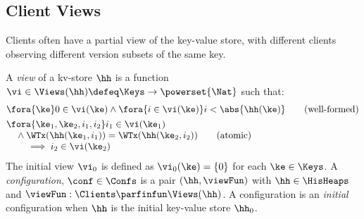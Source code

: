 

\subsection{Client Views}

Clients often have a partial view of the key-value store, 
with different clients observing 
different version subsets  of the same key.

\begin{definition}[View]
\label{def:view}
\label{def:cuts}
\label{def:views}
\label{def:configuration}
A \emph{view} of a kv-store $\hh$ is a function
$\vi \in \Views(\hh) \defeq \Keys \to\powerset{\Nat}$ such that:
\begin{align}
    & \fora{ \ke } 
    0 \in \vi(\ke) 
    \wedge \fora{ i \in \vi(\ke) } 
    i < \abs{ \hh(\ke) } 
    \tag{well-formed}
    \label{eq:view.wf}\\
    & 
    \begin{array}{@{}l@{}}
    \fora{ \ke_1,\ke_2, i_1, i_2} 
	i_1 \in \vi(\ke_1)  \\
    \quad {} \land \WTx(\hh(\ke_1, i_1)) = \WTx(\hh(\ke_2, i_2))  \\
    \qquad {} \implies i_2 \in \vi(\ke_2)
    \end{array}
	\tag{atomic}
	\label{eq:view.atomic}
\end{align}
The initial view $\vi_{0}$ is defined as $\vi_{0}(\ke) = \{0\}$ for
each $\ke \in \Keys$. A \emph{configuration}, $\conf \in \Confs$  is a pair $ (\hh, \viewFun)$
with $\hh \in \HisHeaps$ and
$\viewFun : \Clients \parfinfun \Views(\hh)$. A configuration is an 
\emph{initial} configuration when $\hh$ is the initial key-value store
$\hh_{0}$. 
\end{definition}
%


